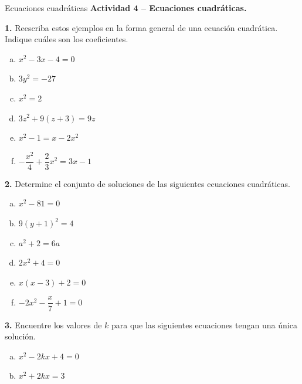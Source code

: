 \documentclass[9pt, aspectratio=169]{beamer}
\begin{document}
\begin{frame}{Ecuaciones cuadráticas}
    \textbf{Actividad 4 -- Ecuaciones cuadráticas.} \medskip

\textbf{1.} Reescriba estos ejemplos en la forma general de una ecuación cuadrática. Indique cuáles son los coeficientes.
\begin{multicols}{3}
\begin{enumerate}[a)]
    \item $x^2 - 3x - 4 = 0$
    \item $3y^2=-27$
    \item $x^2 = 2$
    \item $3z^2+9(z+3)=9z$
    \item $x^2-1=x-2x^2$
    \item $-\dfrac{x^2}{4} + \dfrac{2}{3} x^ 2 = 3x-1$
\end{enumerate}
\end{multicols}

\textbf{2.} Determine el conjunto de soluciones de las siguientes ecuaciones cuadráticas.
\begin{multicols}{3}
    \begin{enumerate}[a)]
        \item $x^2 - 81 = 0$ 
        \item $9(y+1)^2 = 4$
        \item $a^2 + 2 = 6a$
        \item $2x^2+4=0$
        \item $x(x-3)+2=0$
        \item $-2x^2 - \dfrac{x}{7} + 1 = 0$
    \end{enumerate}
\end{multicols}

\textbf{3.} Encuentre los valores de $k$ para que las siguientes ecuaciones tengan una única solución.
\begin{multicols}{2}
    \begin{enumerate}[a)]
        \item $x^2 - 2 k x + 4=0$
        \item $x^2 + 2 k x = 3$
    \end{enumerate}
\end{multicols}
\end{frame}
\end{document}
